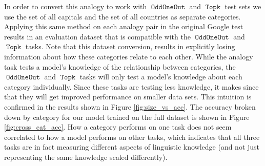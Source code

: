 \documentclass[11pt,a4paper]{article}
\DeclareMathOperator{\OddOneOut}{\texttt{OddOneOut}}
\DeclareMathOperator{\topk}{\texttt{Topk}}
\begin{document}
In order to convert this analogy to work with $\OddOneOut$ and $\topk$ test sets we use the set of all capitals and the set of all countries as separate categories.
Applying this same method on each analogy pair in the original Google test results in an evaluation dataset that is compatible with the $\OddOneOut$ and $\topk$ tasks.
Note that this dataset conversion, results in explicitly losing information about how these categories relate to each other.
While the analogy task tests a model's knowledge of the relationship between categories,
 the $\OddOneOut$ and $\topk$ tasks will only test a model's knowledge about each category individually.
Since these tasks are testing less knowledge,
it makes since that they will get improved performance on smaller data sets.
This intuition is confirmed in the results shown in Figure \ref{fig:size_vs_acc}.
The accuracy broken down by category for our model trained on the full dataset is shown in Figure \ref{fig:cross_cat_acc}.
How a category performs on one task does not seem correlated to how a model performs on other tasks,
which indicates that all three tasks are in fact measuring different aspects of linguistic knowledge (and not just representing the same knowledge scaled differently).
\end{document}
